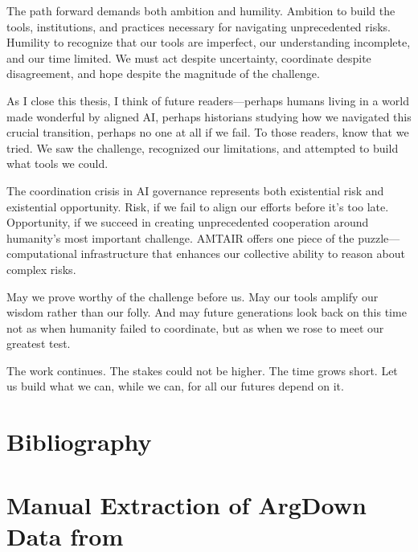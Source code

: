 \documentclass[
  11pt,
  letterpaper,
]{book}
\begin{document}
The path forward demands both ambition and humility. Ambition to build
the tools, institutions, and practices necessary for navigating
unprecedented risks. Humility to recognize that our tools are imperfect,
our understanding incomplete, and our time limited. We must act despite
uncertainty, coordinate despite disagreement, and hope despite the
magnitude of the challenge.

As I close this thesis, I think of future readers---perhaps humans
living in a world made wonderful by aligned AI, perhaps historians
studying how we navigated this crucial transition, perhaps no one at all
if we fail. To those readers, know that we tried. We saw the challenge,
recognized our limitations, and attempted to build what tools we could.

The coordination crisis in AI governance represents both existential
risk and existential opportunity. Risk, if we fail to align our efforts
before it's too late. Opportunity, if we succeed in creating
unprecedented cooperation around humanity's most important challenge.
AMTAIR offers one piece of the puzzle---computational infrastructure
that enhances our collective ability to reason about complex risks.

May we prove worthy of the challenge before us. May our tools amplify
our wisdom rather than our folly. And may future generations look back
on this time not as when humanity failed to coordinate, but as when we
rose to meet our greatest test.

The work continues. The stakes could not be higher. The time grows
short. Let us build what we can, while we can, for all our futures
depend on it.


\chapter*{Bibliography}\label{bibliography}


\printbibliography[heading=none]

\cleardoublepage
{}
{}
\appendix

\chapter{\texorpdfstring{Manual Extraction of ArgDown Data from
\textcite{bucknall2022}}{Manual Extraction of ArgDown Data from @bucknall2022}}\label{sec-bucknall2022}
\end{document}

